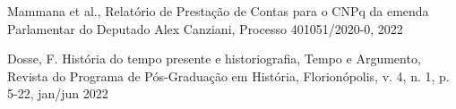 \documentclass[
12pt,		%
openright,	%
twoside,  %
a4paper,			%
chapter=TITLE,		%
english,			%
french,				%
spanish,			%
brazil				%
]{USPSC-classe/USPSC}
\begin{document}
\begin{flushleft}
\begin{flushleft}
\begin{flushleft}
\begin{flushleft}
\begin{flushleft}
\begin{flushleft}
\begin{flushleft}
\begin{flushleft}
[WASHCNPq, 2022] Mammana et al., Relat\'orio de Presta\c{c}\~ao de Contas para o CNPq da emenda Parlamentar do Deputado Alex Canziani, Processo 401051/2020-0, 2022
\end{flushleft}


\end{flushleft}


\end{flushleft}


\end{flushleft}


\end{flushleft}


\end{flushleft}


\end{flushleft}


\end{flushleft}


\begin{flushleft}
\begin{flushleft}
\begin{flushleft}
\begin{flushleft}
\begin{flushleft}
\begin{flushleft}
\begin{flushleft}
\begin{flushleft}
[DOSSE, 2012] Dosse, F. Hist\'oria do tempo presente e historiografia, Tempo e Argumento, Revista do Programa de P\'os-Gradua\c{c}\~ao em Hist\'oria, Florion\'opolis, v. 4, n. 1, p. 5-22, jan/jun 2022
\end{flushleft}


\end{flushleft}


\end{flushleft}


\end{flushleft}


\end{flushleft}


\end{flushleft}


\end{flushleft}


\end{flushleft}
\end{document}
